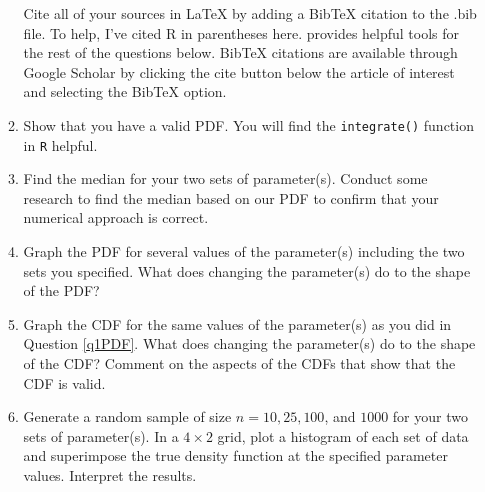 \documentclass{article}\usepackage[]{graphicx}\usepackage[]{color}
\begin{document}
\begin{enumerate}
\begin{enumerate}
  Cite all of your sources in LaTeX by adding a BibTeX citation to the .bib file. 
  To help, I've cited R \citep{R21} in parentheses here. \cite{R21} provides helpful 
  tools for the rest of the questions below. BibTeX citations are available through 
  Google Scholar by clicking the cite button below the article of  interest and 
  selecting the BibTeX option.
	\item Show that you have a valid PDF. You will find the \texttt{integrate()} 
	function in \texttt{R} helpful.
	\item Find the median for your two sets of parameter(s). Conduct some research 
	to find the median based on our PDF to confirm that your numerical approach is 
	correct. 
	\item \label{q1PDF} Graph the PDF for several values of the parameter(s) 
	including the two sets you specified. What does changing the parameter(s) do 
	to the shape of the PDF?
	 \item Graph the CDF for the same values of the parameter(s) as you did in 
	 Question \ref{q1PDF}. What does changing the parameter(s) do to the shape of 
	 the CDF? Comment on the aspects of the CDFs that show that the CDF is valid.
  \item Generate a random sample of size $n=10, 25, 100$, and $1000$ for your 
  two sets of parameter(s). In a $4 \times 2$ grid, plot a histogram of each set
  of data and superimpose the true density function at the specified parameter 
  values. Interpret the results.
	\end{enumerate}

\end{enumerate}
\end{document}
